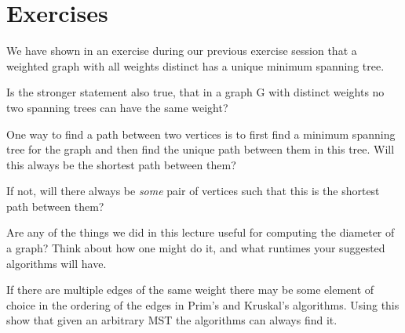 \documentclass[nobib]{tufte-handout}
\begin{document}
\section{Exercises}

\begin{xca}
  We have shown in an exercise during our previous exercise session that a weighted graph with all weights distinct has a unique minimum spanning tree.

  Is the stronger statement also true, that in a graph G with distinct weights no two spanning trees can have the same weight?
\end{xca}

\begin{xca}
  One way to find a path between two vertices is to first find a minimum spanning tree for the graph and then find the unique path between them in this tree. Will this always be the shortest path between them?

  If not, will there always be \emph{some} pair of vertices such that this is the shortest path between them?
\end{xca}

\begin{xca}
  Are any of the things we did in this lecture useful for computing the diameter of a graph? Think about how one might do it, and what runtimes your suggested algorithms will have.
\end{xca}

\begin{xca}
  If there are multiple edges of the same weight there may be some element of choice in the ordering of the edges in Prim's and Kruskal's algorithms. Using this show that given an arbitrary MST the algorithms can always find it.
\end{xca}

%
%
\end{document}
